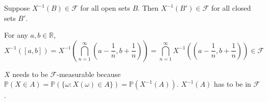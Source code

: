 \documentclass{huhtakm-template-book}
\newcommand{\prob}{\mathbb{P}}
\begin{document}
    \begin{cla}
        Suppose $X^{-1}(B)\in\mathcal{F}$ for all open sets $B$. Then $X^{-1}(B')\in\mathcal{F}$ for all closed sets $B'$.
    \end{cla}
    \begin{proofing}
    For any $a,b\in\mathbb{R}$,
        \begin{equation*}
            X^{-1}([a,b])=X^{-1}\left(\bigcap_{n=1}^{\infty}\left(a-\frac{1}{n},b+\frac{1}{n}\right)\right)=\bigcap_{n=1}^{\infty}X^{-1}\left(\left(a-\frac{1}{n},b+\frac{1}{n}\right)\right)\in\mathcal{F}
        \end{equation*}
    \end{proofing}
    \begin{rem}
        $X$ needs to be $\mathcal{F}$-measurable because $\prob(X\in A)=\prob(\{\omega:X(\omega)\in A\})=\prob(X^{-1}(A))$. $X^{-1}(A)$ has to be in $\mathcal{F}$.
    \end{rem}
    
\end{document}
